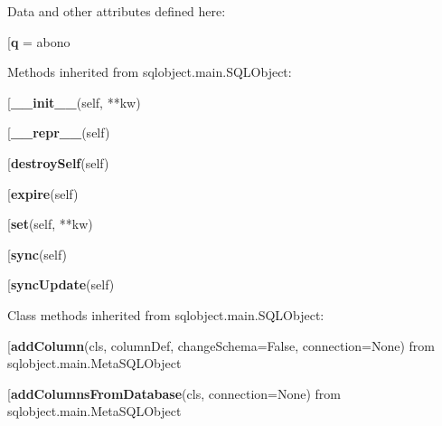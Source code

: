 Data and other attributes defined here:\\
\begin{description}\item[{\bf q} = abono\end{description}


Methods inherited from sqlobject.main.SQLObject:\\
\begin{description}\item[{\bf \_\_init\_\_}(self, **kw)\end{description}

\begin{description}\item[{\bf \_\_repr\_\_}(self)\end{description}

\begin{description}\item[{\bf destroySelf}(self)\end{description}

\begin{description}\item[{\bf expire}(self)\end{description}

\begin{description}\item[{\bf set}(self, **kw)\end{description}

\begin{description}\item[{\bf sync}(self)\end{description}

\begin{description}\item[{\bf syncUpdate}(self)\end{description}


Class methods inherited from sqlobject.main.SQLObject:\\
\begin{description}\item[{\bf addColumn}(cls, columnDef, changeSchema=False, connection=None) from sqlobject.main.MetaSQLObject\end{description}

\begin{description}\item[{\bf addColumnsFromDatabase}(cls, connection=None) from sqlobject.main.MetaSQLObject\end{description}

